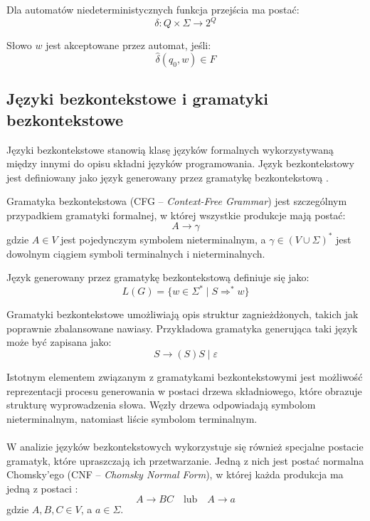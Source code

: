 \documentclass[12pt]{article}
\begin{document}
Dla automatów niedeterministycznych funkcja przejścia ma postać:
\begin{equation}
\delta: Q \times \Sigma \rightarrow 2^Q
\end{equation}

Słowo $w$ jest akceptowane przez automat, jeśli:
\begin{equation}
\hat{\delta}(q_0, w) \in F
\end{equation}

\subsection{Języki bezkontekstowe i gramatyki bezkontekstowe}

Języki bezkontekstowe stanowią klasę języków formalnych wykorzystywaną między innymi do opisu składni języków programowania. Język bezkontekstowy jest definiowany jako język generowany przez gramatykę bezkontekstową \cite{hopcroft2007,sipser2012,linz2016}.

Gramatyka bezkontekstowa (CFG -- \textit{Context-Free Grammar}) jest szczególnym przypadkiem gramatyki formalnej, w której wszystkie produkcje mają postać:
\begin{equation}
A \rightarrow \gamma
\end{equation}
gdzie $A \in V$ jest pojedynczym symbolem nieterminalnym, a $\gamma \in (V \cup \Sigma)^*$ jest dowolnym ciągiem symboli terminalnych i nieterminalnych.

Język generowany przez gramatykę bezkontekstową definiuje się jako:
\begin{equation}
L(G) = \{ w \in \Sigma^* \mid S \Rightarrow^* w \}
\end{equation}

Gramatyki bezkontekstowe umożliwiają opis struktur zagnieżdżonych, takich jak poprawnie zbalansowane nawiasy. Przykładowa gramatyka generująca taki język może być zapisana jako:
\begin{equation}
S \rightarrow (S)S \mid \varepsilon
\end{equation}

Istotnym elementem związanym z gramatykami bezkontekstowymi jest możliwość reprezentacji procesu generowania w postaci drzewa składniowego, które obrazuje strukturę wyprowadzenia słowa. Węzły drzewa odpowiadają symbolom nieterminalnym, natomiast liście symbolom terminalnym.
\\
\\
W analizie języków bezkontekstowych wykorzystuje się również specjalne postacie gramatyk, które upraszczają ich przetwarzanie. Jedną z nich jest postać normalna Chomsky’ego (CNF -- \textit{Chomsky Normal Form}), w której każda produkcja ma jedną z postaci \cite{chomsky1959,hopcroft2007}:
\begin{equation}
A \rightarrow BC \quad \text{lub} \quad A \rightarrow a
\end{equation}
gdzie $A, B, C \in V$, a $a \in \Sigma$.
\end{document}
